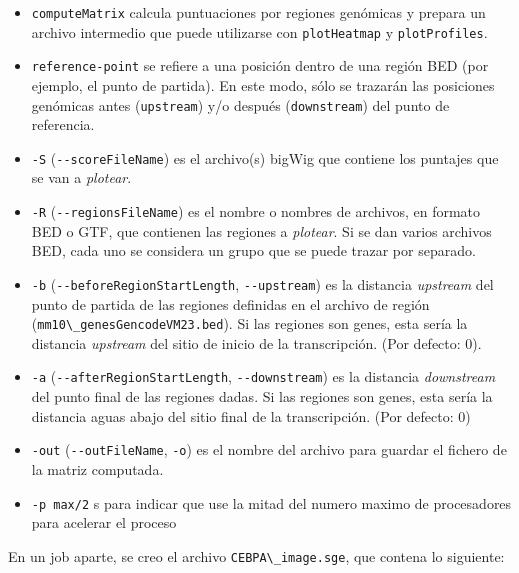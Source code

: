 \documentclass[
]{article}
\newcommand{\passthrough}[1]{#1}
\providecommand{\tightlist}{%
  \setlength{\itemsep}{0pt}\setlength{\parskip}{0pt}}
\begin{document}
\begin{itemize}
\tightlist
\item
  \passthrough{\lstinline!computeMatrix!} calcula puntuaciones por
  regiones genómicas y prepara un archivo intermedio que puede
  utilizarse con \passthrough{\lstinline!plotHeatmap!} y
  \passthrough{\lstinline!plotProfiles!}.
\item
  \passthrough{\lstinline!reference-point!} se refiere a una posición
  dentro de una región BED (por ejemplo, el punto de partida). En este
  modo, sólo se trazarán las posiciones genómicas antes
  (\passthrough{\lstinline!upstream!}) y/o después
  (\passthrough{\lstinline!downstream!}) del punto de referencia.
\item
  \passthrough{\lstinline!-S!}
  (\passthrough{\lstinline!--scoreFileName!}) es el archivo(s) bigWig
  que contiene los puntajes que se van a \emph{plotear}.
\item
  \passthrough{\lstinline!-R!}
  (\passthrough{\lstinline!--regionsFileName!}) es el nombre o nombres
  de archivos, en formato BED o GTF, que contienen las regiones a
  \emph{plotear}. Si se dan varios archivos BED, cada uno se considera
  un grupo que se puede trazar por separado.
\item
  \passthrough{\lstinline!-b!}
  (\passthrough{\lstinline!--beforeRegionStartLength!},
  \passthrough{\lstinline!--upstream!}) es la distancia \emph{upstream}
  del punto de partida de las regiones definidas en el archivo de región
  (\passthrough{\lstinline!mm10\_genesGencodeVM23.bed!}). Si las
  regiones son genes, esta sería la distancia \emph{upstream} del sitio
  de inicio de la transcripción. (Por defecto: 0).
\item
  \passthrough{\lstinline!-a!}
  (\passthrough{\lstinline!--afterRegionStartLength!},
  \passthrough{\lstinline!--downstream!}) es la distancia
  \emph{downstream} del punto final de las regiones dadas. Si las
  regiones son genes, esta sería la distancia aguas abajo del sitio
  final de la transcripción. (Por defecto: 0)
\item
  \passthrough{\lstinline!-out!}
  (\passthrough{\lstinline!--outFileName!},
  \passthrough{\lstinline!-o!}) es el nombre del archivo para guardar el
  fichero de la matriz computada.
\item
  \passthrough{\lstinline!-p max/2!} s para indicar que use la mitad del
  numero maximo de procesadores para acelerar el proceso
\end{itemize}

En un job aparte, se creo el archivo
\passthrough{\lstinline!CEBPA\_image.sge!}, que contena lo siguiente:
\end{document}
